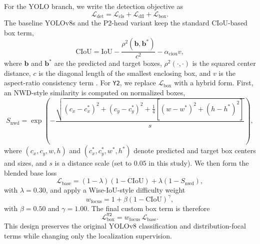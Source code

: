 \documentclass[journal,article,submit,moreauthors,pdftex]{Definitions/tsp}
\begin{document}
For the YOLO branch, we write the detection objective as
\begin{equation}
\mathcal{L}_{\text{det}} = \mathcal{L}_{\text{cls}} + \mathcal{L}_{\text{dfl}} + \mathcal{L}_{\text{box}}.
\end{equation}
The baseline YOLOv8s and the P2-head variant keep the standard CIoU-based box term,
\begin{equation}
\mathrm{CIoU} = \mathrm{IoU} - \frac{\rho^2(\mathbf{b}, \mathbf{b}^{\ast})}{c^2} - \alpha_{\mathrm{ciou}} v,
\end{equation}
where $\mathbf{b}$ and $\mathbf{b}^{\ast}$ are the predicted and target boxes, $\rho^2(\cdot,\cdot)$ is the squared center distance, $c$ is the diagonal length of the smallest enclosing box, and $v$ is the aspect-ratio consistency term \citep{zheng_2020_diou}. For \texttt{Y2}, we replace $\mathcal{L}_{\text{box}}$ with a hybrid form. First, an NWD-style similarity is computed on normalized boxes,
\begin{equation}
S_{\mathrm{nwd}} = \exp\!\left(
-\frac{
\sqrt{
(c_x-c_x^{\ast})^2 + (c_y-c_y^{\ast})^2 +
\frac{1}{4}\left[(w-w^{\ast})^2 + (h-h^{\ast})^2\right]
}
}{s}
\right),
\end{equation}
where $(c_x, c_y, w, h)$ and $(c_x^{\ast}, c_y^{\ast}, w^{\ast}, h^{\ast})$ denote predicted and target box centers and sizes, and $s$ is a distance scale (set to $0.05$ in this study). We then form the blended base loss
\begin{equation}
\mathcal{L}_{\text{base}} = (1-\lambda)(1-\mathrm{CIoU}) + \lambda(1-S_{\mathrm{nwd}}),
\end{equation}
with $\lambda = 0.30$, and apply a Wise-IoU-style difficulty weight
\begin{equation}
w_{\mathrm{focus}} = 1 + \beta (1-\mathrm{CIoU})^{\gamma},
\end{equation}
with $\beta = 0.50$ and $\gamma = 1.00$. The final custom box term is therefore
\begin{equation}
\mathcal{L}_{\text{box}}^{\texttt{Y2}} = w_{\mathrm{focus}} \, \mathcal{L}_{\text{base}}.
\end{equation}
This design preserves the original YOLOv8 classification and distribution-focal terms while changing only the localization supervision.
\end{document}

